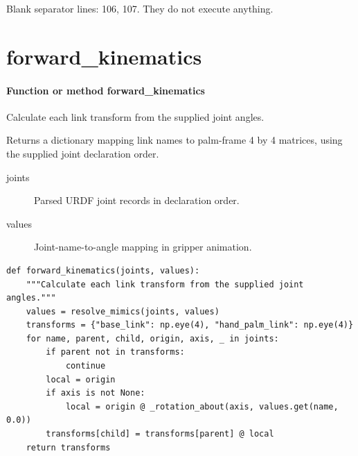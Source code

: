 \documentclass[11pt,a4paper]{book}
\begin{document}
Blank separator lines: 106, 107. They do not execute anything.

\section{forward\_kinematics}

\paragraph{Function or method forward\_kinematics}
Calculate each link transform from the supplied joint angles.

Returns a dictionary mapping link names to palm-frame 4 by 4 matrices, using the supplied joint declaration order.

\begin{description}
\item[joints] Parsed URDF joint records in declaration order.
\item[values] Joint-name-to-angle mapping in gripper animation.
\end{description}

\begin{lstlisting}[firstnumber=108]
def forward_kinematics(joints, values):
    """Calculate each link transform from the supplied joint angles."""
    values = resolve_mimics(joints, values)
    transforms = {"base_link": np.eye(4), "hand_palm_link": np.eye(4)}
    for name, parent, child, origin, axis, _ in joints:
        if parent not in transforms:
            continue
        local = origin
        if axis is not None:
            local = origin @ _rotation_about(axis, values.get(name, 0.0))
        transforms[child] = transforms[parent] @ local
    return transforms


\end{lstlisting}
\end{document}
